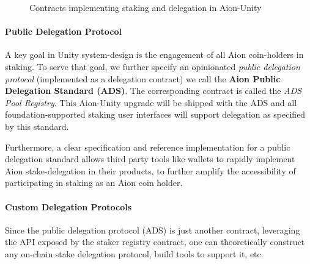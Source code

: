 \begin{figure}[ht]
\centering
{}
\caption{Contracts implementing staking and delegation in Aion-Unity}
\label{fig:delegation_scheme}
\end{figure}

\paragraph{Public Delegation Protocol}
A key goal in Unity system-design is the engagement of all Aion coin-holders in staking. To serve that goal, we further specify an opinionated \textit{public delegation protocol} (implemented as a delegation contract) we call the \textbf{Aion Public Delegation Standard (ADS)}. The corresponding contract is called the \textit{ADS Pool Registry}. This Aion-Unity upgrade will be shipped with the ADS and all foundation-supported staking user interfaces will support delegation as specified by this standard. 

Furthermore, a clear specification and reference implementation for a public delegation standard allows third party tools like wallets to rapidly implement Aion stake-delegation in their products, to further amplify the accessibility of participating in staking as an Aion coin holder. 
    
\paragraph{Custom Delegation Protocols}
Since the public delegation protocol (ADS) is just another contract, leveraging the API exposed by the staker registry contract, one can theoretically construct any on-chain stake delegation protocol, build tools to support it, etc. 

